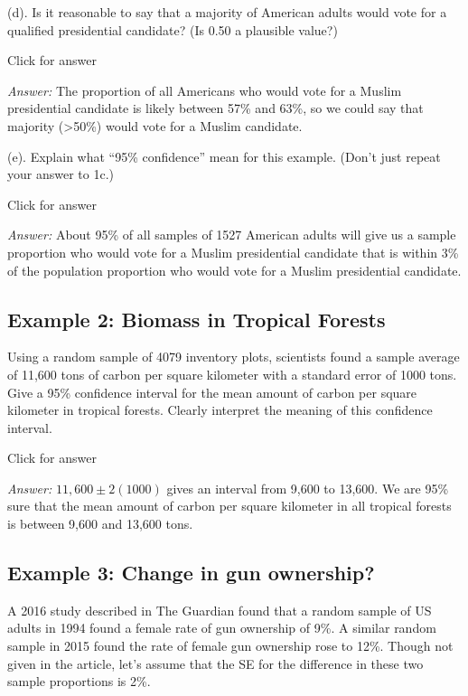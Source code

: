 \documentclass[
]{book}
\begin{document}
(d). Is it reasonable to say that a majority of American adults would vote for a qualified presidential candidate? (Is 0.50 a plausible value?)

Click for answer

\emph{Answer:} The proportion of all Americans who would vote for a Muslim presidential candidate is likely between 57\% and 63\%, so we could say that majority (\textgreater50\%) would vote for a Muslim candidate.

(e). Explain what ``95\% confidence'' mean for this example. (Don't just repeat your answer to 1c.)

Click for answer

\emph{Answer:} About 95\% of all samples of 1527 American adults will give us a sample proportion who would vote for a Muslim presidential candidate that is within 3\% of the population proportion who would vote for a Muslim presidential candidate.

\hypertarget{example-2-biomass-in-tropical-forests}{%
\subsection{Example 2: Biomass in Tropical Forests}\label{example-2-biomass-in-tropical-forests}}

Using a random sample of 4079 inventory plots, scientists found a sample average of 11,600 tons of carbon per square kilometer with a standard error of 1000 tons. Give a 95\% confidence interval for the mean amount of carbon per square kilometer in tropical forests. Clearly interpret the meaning of this confidence interval.

Click for answer

\emph{Answer:} \(11,600 \pm 2(1000)\) gives an interval from 9,600 to 13,600. We are 95\% sure that the mean amount of carbon per square kilometer in all tropical forests is between 9,600 and 13,600 tons.

\hypertarget{example-3-change-in-gun-ownership}{%
\subsection{Example 3: Change in gun ownership?}\label{example-3-change-in-gun-ownership}}

A 2016 study described in The Guardian found that a random sample of US adults in 1994 found a female rate of gun ownership of 9\%. A similar random sample in 2015 found the rate of female gun ownership rose to 12\%. Though not given in the article, let's assume that the SE for the difference in these two sample proportions is 2\%.
\end{document}
